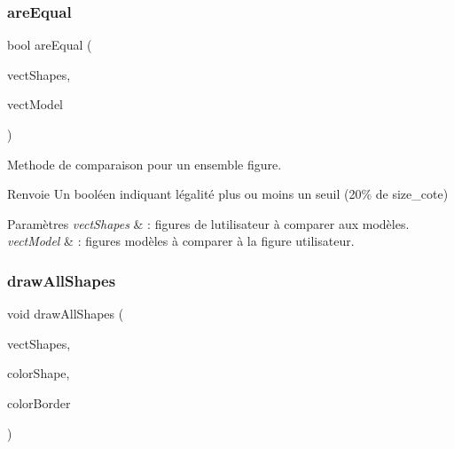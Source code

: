 \subsubsection{\texorpdfstring{are\+Equal}{areEqual}}
{\footnotesize\ttfamily bool are\+Equal (\begin{DoxyParamCaption}\item[{const std\+::vector$<$ std\+::shared\+\_\+ptr$<$ \hyperlink{classgeometric_shape_1_1_shape}{geometric\+Shape\+::\+Shape} $>$$>$ \&}]{vect\+Shapes,  }\item[{const std\+::vector$<$ std\+::shared\+\_\+ptr$<$ \hyperlink{classgeometric_shape_1_1_shape}{geometric\+Shape\+::\+Shape} $>$$>$ \&}]{vect\+Model }\end{DoxyParamCaption})\hspace{0.3cm}{\ttfamily [friend]}}



Methode de comparaison pour un ensemble figure. 

\begin{DoxyReturn}{Renvoie}
Un booléen indiquant l\textquotesingle{}égalité plus ou moins un seuil (20\% de size\+\_\+cote) 
\end{DoxyReturn}

\begin{DoxyParams}{Paramètres}
{\em vect\+Shapes} & \+: figures de l\textquotesingle{}utilisateur à comparer aux modèles. \\
\hline
{\em vect\+Model} & \+: figures modèles à comparer à la figure utilisateur. \\
\hline
\end{DoxyParams}
\mbox{\label{classgeometric_shape_1_1_shape_a6fa8a7bdf815401f5956bf4a02ecf544}} 
\subsubsection{\texorpdfstring{draw\+All\+Shapes}{drawAllShapes}\hspace{0.1cm}{\footnotesize\ttfamily [1/2]}}
{\footnotesize\ttfamily void draw\+All\+Shapes (\begin{DoxyParamCaption}\item[{const std\+::vector$<$ std\+::shared\+\_\+ptr$<$ \hyperlink{classgeometric_shape_1_1_shape}{geometric\+Shape\+::\+Shape} $>$$>$ \&}]{vect\+Shapes,  }\item[{M\+L\+V\+\_\+\+Color}]{color\+Shape,  }\item[{M\+L\+V\+\_\+\+Color}]{color\+Border }\end{DoxyParamCaption})\hspace{0.3cm}{\ttfamily [friend]}}



